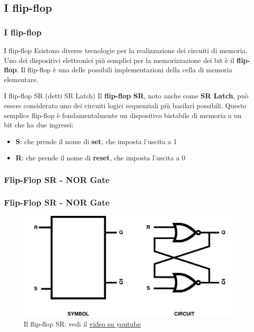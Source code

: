 \subsection[I flip-flop]{I flip-flop}
\begin{frame}
	\frametitle{I flip-flop}
	
	\begin{block}{I flip-flop}
		Esistono diverse tecnologie per la realizzazione dei circuiti di memoria. Uno dei dispositivi elettronici più semplici per la memorizzazione dei bit è il \textbf{flip-flop}. Il flip-flop è una delle possibili implementazioni della cella di memoria elementare.		
	\end{block}
	
	\begin{block}{I flip-flop SR (detti SR Latch)}
		Il \textbf{flip-flop SR}, noto anche come \textbf{SR Latch}, può essere considerato uno dei circuiti logici sequenziali più basilari possibili. Questo semplice flip-flop è fondamentalmente un dispositivo bistabile di memoria a un bit che ha due ingressi:
		\begin{itemize}
			\item \textbf{S}: che prende il nome di \textbf{set}, che imposta l'uscita a 1
			\item \textbf{R}: che prende il nome di \textbf{reset}, che imposta l'uscita a 0
		\end{itemize}
	\end{block}
	
\end{frame}


\subsubsection[Flip-Flop SR - NOR Gate]{Flip-Flop SR - NOR Gate}
\begin{frame}
	\frametitle{Flip-Flop SR - NOR Gate}
	 
	\begin{figure}[!htbp] 
		\centering
		\includegraphics[width=0.95\linewidth]{images/5_memory/flip_flop_sr_nor.pdf}
		\caption{Il flip-flop SR: vedi il \underline{\href{https://www.youtube.com/watch?v=br2pbjAnP2k}{video su youtube}}}
	\end{figure}
	
\end{frame}

